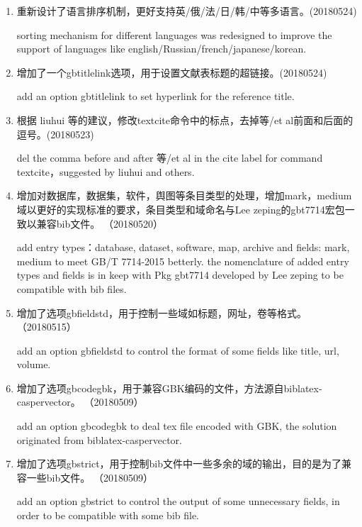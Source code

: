 \label{up:180403}
\begin{enumerate}
\item 重新设计了语言排序机制，更好支持英/俄/法/日/韩/中等多语言。(20180524)

sorting mechanism for different languages was redesigned to improve the support of languages like english/Russian/french/japanese/korean.

\item 增加了一个gbtitlelink选项，用于设置文献表标题的超链接。(20180524)

add an option gbtitlelink to set hyperlink for the reference title.

\item 根据 liuhui 等的建议，修改textcite命令中的标点，去掉等/et al前面和后面的逗号。(20180523)

del the comma before and after 等/et al in the cite label for command textcite，suggested by liuhui and others.

\item 增加对数据库，数据集，软件，舆图等条目类型的处理，增加mark，medium域以更好的实现标准的要求，条目类型和域命名与Lee zeping的gbt7714宏包一致以兼容bib文件。 （20180520）

add entry types：database, dataset, software, map, archive and fields: mark, medium to meet GB/T 7714-2015 betterly. the nomenclature of added entry types and fields is in keep with Pkg gbt7714 developed by Lee zeping to be compatible with bib files.

\item 增加了选项gbfieldstd，用于控制一些域如标题，网址，卷等格式。 （20180515）

add an option gbfieldstd to control the format of some fields like title, url, volume.

\item 增加了选项gbcodegbk，用于兼容GBK编码的文件，方法源自biblatex-caspervector。 （20180509）

add an option gbcodegbk to deal tex file encoded with GBK, the solution originated from biblatex-caspervector.

\item 增加了选项gbstrict，用于控制bib文件中一些多余的域的输出，目的是为了兼容一些bib文件。 （20180509）

add an option gbstrict to control the output of some unnecessary fields, in order to be compatible with some bib file.


\end{enumerate}
